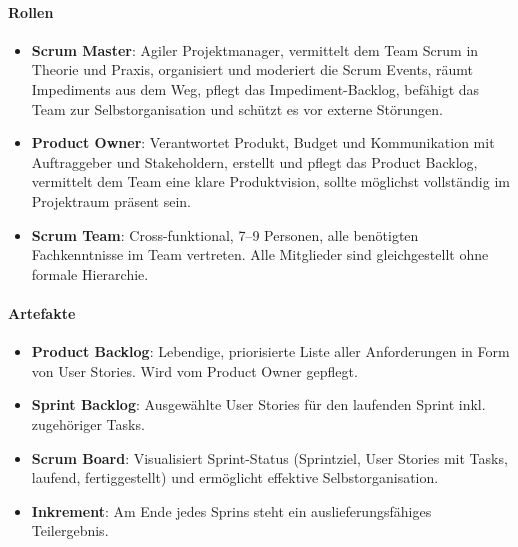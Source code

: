 \documentclass[
    a4paper,
    11pt,
    bibliography=totoc,
    listof=totoc,
    parskip=half,
    headings=normal
]{scrbook}
\begin{document}
\paragraph{Rollen}
\begin{itemize}[noitemsep]
      \item \textbf{Scrum Master}: Agiler Projektmanager, vermittelt dem Team Scrum
            in Theorie und Praxis, organisiert und moderiert die Scrum Events,
            räumt Impediments aus dem Weg, pflegt das Impediment-Backlog, befähigt das
            Team zur Selbstorganisation und schützt es vor externe Störungen\autocite[vgl.][Kap.~3]{Reppin2020}.
      \item \textbf{Product Owner}: Verantwortet Produkt, Budget und Kommunikation
            mit Auftraggeber und Stakeholdern, erstellt und pflegt das Product Backlog,
            vermittelt dem Team eine klare Produktvision, sollte möglichst vollständig
            im Projektraum präsent sein\autocite[vgl.][Kap.~3]{Reppin2020}.
      \item \textbf{Scrum Team}: Cross-funktional, 7--9 Personen, alle benötigten
            Fachkenntnisse im Team vertreten. Alle Mitglieder sind gleichgestellt ohne formale Hierarchie\autocite[vgl.][Kap.~3]{Reppin2020}.
\end{itemize}

\paragraph{Artefakte}
\begin{itemize}[noitemsep]
      \item \textbf{Product Backlog}: Lebendige, priorisierte Liste aller Anforderungen
            in Form von User Stories. Wird vom Product Owner gepflegt.
      \item \textbf{Sprint Backlog}: Ausgewählte User Stories für den laufenden Sprint
            inkl. zugehöriger Tasks.
      \item \textbf{Scrum Board}: Visualisiert Sprint-Status (Sprintziel, User Stories
            mit Tasks, laufend, fertiggestellt) und ermöglicht effektive Selbstorganisation.
      \item \textbf{Inkrement}: Am Ende jedes Sprins steht ein auslieferungsfähiges Teilergebnis.
\end{itemize}
\end{document}
